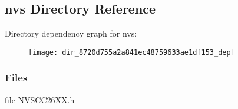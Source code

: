 \subsection{nvs Directory Reference}
\label{dir_8720d755a2a841ec48759633ae1df153}
Directory dependency graph for nvs\+:
\nopagebreak
\begin{figure}[H]
\begin{center}
\leavevmode
\texttt{[image: dir\_8720d755a2a841ec48759633ae1df153\_dep]}
\end{center}
\end{figure}
\subsubsection*{Files}
\begin{DoxyCompactItemize}
\item 
file \hyperlink{_n_v_s_c_c26_x_x_8h}{N\+V\+S\+C\+C26\+X\+X.\+h}
\end{DoxyCompactItemize}
